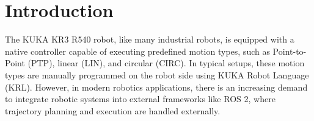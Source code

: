 \section{Introduction}

The KUKA KR3 R540 robot, like many industrial robots,
is equipped with a native controller capable of executing 
predefined motion types, such as Point-to-Point (PTP), linear (LIN), 
and circular (CIRC). In typical setups, these motion types are manually 
programmed on the robot side using KUKA Robot Language (KRL). However, 
in modern robotics applications, there is an increasing demand to integrate 
robotic systems into external frameworks like ROS 2, where trajectory planning
and execution are handled externally.
